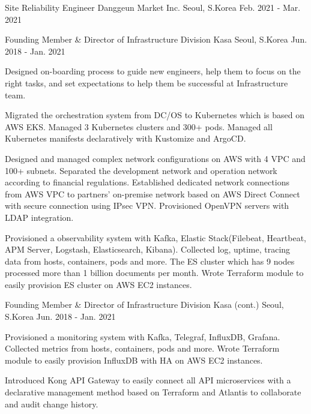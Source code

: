 \begin{cventries}
  \cventry
    {Site Reliability Engineer} %
    {Danggeun Market Inc.} %
    {Seoul, S.Korea} %
    {Feb. 2021 - Mar. 2021} %
    {
    }

  \cventry
    {Founding Member \& Director of Infrastructure Division} %
    {Kasa} %
    {Seoul, S.Korea} %
    {Jun. 2018 - Jan. 2021} %
    {
      \begin{cvitems} %
        \item {Designed on-boarding process to guide new engineers, help them to focus on the right tasks, and set expectations to help them be successful at Infrastructure team.}
        \item {Migrated the orchestration system from DC/OS to Kubernetes which is based on AWS EKS. Managed 3 Kubernetes clusters and 300+ pods. Managed all Kubernetes manifests declaratively with Kustomize and ArgoCD.}
        \item {Designed and managed complex network configurations on AWS with 4 VPC and 100+ subnets. Separated the development network and operation network according to financial regulations. Established dedicated network connections from AWS VPC to partners' on-premise network based on AWS Direct Connect with secure connection using IPsec VPN. Provisioned OpenVPN servers with LDAP integration.}
        \item {Provisioned a observability system with Kafka, Elastic Stack(Filebeat, Heartbeat, APM Server, Logstash, Elasticsearch, Kibana). Collected log, uptime, tracing data from hosts, containers, pods and more. The ES cluster which has 9 nodes processed more than 1 billion documents per month. Wrote Terraform module to easily provision ES cluster on AWS EC2 instances.}
    \end{cvitems}
    }
    \newpage
  \cventry
    {Founding Member \& Director of Infrastructure Division} %
    {Kasa (cont.)} %
    {Seoul, S.Korea} %
    {Jun. 2018 - Jan. 2021} %
    {
      \begin{cvitems}
        \item {Provisioned a monitoring system with Kafka, Telegraf, InfluxDB, Grafana. Collected metrics from hosts, containers, pods and more. Wrote Terraform module to easily provision InfluxDB with HA on AWS EC2 instances.}
        \item {Introduced Kong API Gateway to easily connect all API microservices with a declarative management method based on Terraform and Atlantis to collaborate and audit change history.}

\end{cvitems}}
\end{cventries}
